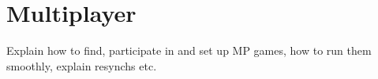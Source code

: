 \chapter{Multiplayer}
Explain how to find, participate in and set up MP games, how to run them
smoothly, explain resynchs etc.


